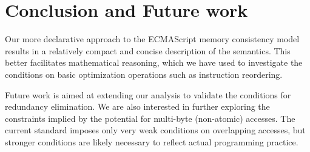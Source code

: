\section{Conclusion and Future work}
Our more declarative approach to the ECMAScript memory consistency model results in a relatively compact and concise description of the semantics.
This better facilitates mathematical reasoning, which we have used to investigate the conditions on basic optimization operations such as instruction reordering.

Future work is aimed at extending our analysis to validate the conditions for redundancy elimination.
We are also interested in further exploring the constraints implied by the potential for multi-byte (non-atomic) accesses.  The current standard imposes only very weak conditions on overlapping accesses, but stronger conditions are likely necessary to reflect actual programming practice.

    
